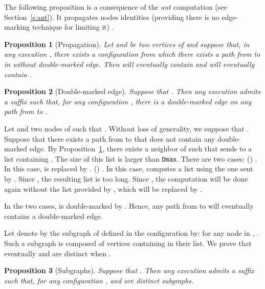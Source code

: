 \documentclass[11pt,english]{article}
\newtheorem{proposition}{Proposition}
\newenvironment{proof}[1][0cm]{
  \begin{list}{\bf Proof.~}{
      \setlength{\itemindent}{0cm}
      \setlength{\labelsep}{0cm}
      \setlength{\labelwidth}{#1}
      \setlength{\leftmargin}{#1}
    \item
    }
}{\hfill
  \end{list}
}
\begin{document}
The following proposition is a consequence of the \emph{ant} computation (see
Section~\ref{s:ant}). It propagates nodes identities (providing there is no
edge-marking technique for limiting it) \cite{DT03,JACIC06}.

\begin{proposition}[Propagation]\label{p:propagation}
  Let  and  be two vertices of  and suppose that, in any execution ,
  there exists a configuration  from which there exists a path from  to 
  in  without double-marked edge. Then  will eventually
  contain  and  will eventually contain .
\end{proposition}


\begin{proposition}[Double-marked edge]\label{p:dme}
  Suppose that . Then any execution admits a suffix
   such that, for any configuration ,
  there is a double-marked edge on any path from  to .
\end{proposition}

\begin{proof}
  Let  and  two nodes of  such that . Without loss
  of generality, we suppose that . Suppose that there exists a
  path from  to  that does not contain any double-marked edge. By
  Proposition~\ref{p:propagation}, there exists a neighbor  of  such that
   sends to  a list containing . The size of this list is larger than
  \texttt{Dmax}. There are two cases:
\newline \noindent 
  () . In this case,  is
    replaced by .
\newline \noindent 
  () . In this case,  computes a list using the
  one sent by . Since , the resulting list is too
  long. Since , the computation will be done again without the
  list provided by , which will be replaced by
  .

  In the two cases,  is double-marked by . Hence, any path from  to 
  will eventually contains a double-marked edge.
\end{proof}

Let denote by  the subgraph of  defined in the
configuration  by: for any node  in , .
Such a subgraph is composed of vertices containing  in their list. We prove
that eventually  and  are distinct when .

\begin{proposition}[Subgraphs]\label{p:subgraphs}
  Suppose that . Then any execution admits a suffix
   such that, for any configuration ,
   and  are distinct subgraphs.
\end{proposition}
\end{document}
